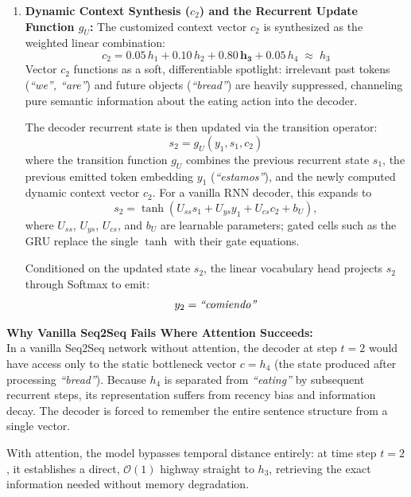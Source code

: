 \begin{enumerate}[leftmargin=*]
    \item \textbf{Dynamic Context Synthesis ($c_2$) and the Recurrent Update Function $g_U$:}
    The customized context vector $c_2$ is synthesized as the weighted linear combination:
    \begin{equation}
        c_2 = 0.05 \, h_1 + 0.10 \, h_2 + \mathbf{0.80 \, h_3} + 0.05 \, h_4 \;\approx\; h_3
    \end{equation}
    Vector $c_2$ functions as a soft, differentiable spotlight: irrelevant past tokens (\textit{“we”, “are”}) and future objects (\textit{“bread”}) are heavily suppressed, channeling pure semantic information about the eating action into the decoder. 

    The decoder recurrent state is then updated via the transition operator:
    \begin{equation}
        s_2 = g_U(y_1, s_1, c_2)
    \end{equation}
    where the transition function $g_U$ combines the previous recurrent state $s_1$, the previous emitted token embedding $y_1$ (\textit{“estamos”}), and the newly computed dynamic context vector $c_2$. For a vanilla RNN decoder, this expands to
    \begin{equation}
        s_2 = \tanh\left(U_{ss}s_1 + U_{ys}y_1 + U_{cs}c_2 + b_U\right),
    \end{equation}
    where $U_{ss}$, $U_{ys}$, $U_{cs}$, and $b_U$ are learnable parameters; gated cells such as the GRU replace the single $\tanh$ with their gate equations.

    Conditioned on the updated state $s_2$, the linear vocabulary head projects $s_2$ through Softmax to emit:
    \begin{equation}
        y_2 = \text{\textit{“comiendo”}}
    \end{equation}
\end{enumerate}

\begin{InsightBox}
\textbf{Why Vanilla Seq2Seq Fails Where Attention Succeeds:} \\
In a vanilla Seq2Seq network without attention, the decoder at step $t=2$ would have access only to the static bottleneck vector $c = h_4$ (the state produced after processing \textit{“bread”}). Because $h_4$ is separated from \textit{“eating”} by subsequent recurrent steps, its representation suffers from recency bias and information decay. The decoder is forced to remember the entire sentence structure from a single vector.

With attention, the model bypasses temporal distance entirely: at time step $t=2$, it establishes a direct, $\mathcal{O}(1)$ highway straight to $h_3$, retrieving the exact information needed without memory degradation.
\end{InsightBox}

